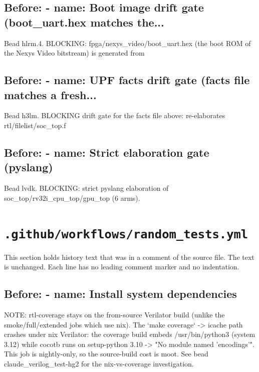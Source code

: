 \begin{record}
\subsection*{Before: - name: Boot image drift gate (boot\_uart.hex matches the...}

\begin{textblock}
Bead hlrm.4. BLOCKING: fpga/nexys_video/boot_uart.hex (the boot ROM of the Nexys Video bitstream) is generated from
\end{textblock}

\subsection*{Before: - name: UPF facts drift gate (facts file matches a fresh...}

\begin{textblock}
Bead h3lm. BLOCKING drift gate for the facts file above: re-elaborates rtl/filelist/soc_top.f
\end{textblock}

\subsection*{Before: - name: Strict elaboration gate (pyslang)}

\begin{textblock}
Bead lvdk. BLOCKING: strict pyslang elaboration of soc_top/rv32i_cpu_top/gpu_top (6 arms).
\end{textblock}

\end{record}

\section{\texttt{.github/workflows/random\_tests.yml}}\label{cr:flow:ci-random-tests}

This section holds history text that was in a comment of the source file. The text is unchanged. Each line has no leading comment marker and no indentation.

\begin{record}

\subsection*{Before: - name: Install system dependencies}

\begin{textblock}
NOTE: rtl-coverage stays on the from-source Verilator build (unlike the
smoke/full/extended jobs which use nix). The `make coverage` -> icache path
crashes under nix Verilator: the coverage build embeds /usr/bin/python3
(system 3.12) while cocotb runs on setup-python 3.10 -> "No module named
'encodings'". This job is nightly-only, so the source-build cost is moot.
See bead claude_verilog_test-hg2 for the nix-vs-coverage investigation.
\end{textblock}

\end{record}

